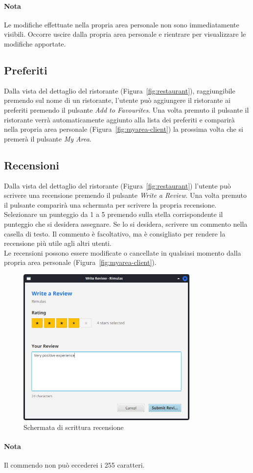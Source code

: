 \paragraph{Nota}
Le modifiche effettuate nella propria area 
personale non sono immediatamente visibili. Occorre uscire 
dalla propria area personale e rientrare per visualizzare 
le modifiche apportate.

\subsection{Preferiti}
Dalla vista del dettaglio del ristorante (Figura~\ref{fig:restaurant}), 
raggiungibile premendo sul nome di un ristorante, l'utente può 
aggiungere il ristorante ai preferiti premendo il pulsante 
\emph{Add to Favourites}. Una volta premuto il pulsante il ristorante 
verrà automaticamente aggiunto alla lista dei preferiti e comparirà
nella propria area personale (Figura~\ref{fig:myarea-client}) la 
prossima volta che si premerà il pulsante \emph{My Area}.

\subsection{Recensioni}
Dalla vista del dettaglio del ristorante (Figura~\ref{fig:restaurant})
l'utente può scrivere una recensione premendo il pulsante 
\emph{Write a Review}. 
Una volta premuto il pulsante comparirà una schermata per scrivere 
la propria recensione.\\
Selezionare un punteggio da 1 a 5 premendo sulla stella corrispondente
il punteggio che si desidera assegnare.
Se lo si desidera, scrivere un commento nella casella di testo.
Il commento è facoltativo, ma è consigliato per rendere la recensione
più utile agli altri utenti.\\
Le recensioni possono essere modificate o cancellate in qualsiasi 
momento dalla propria area personale (Figura~\ref{fig:myarea-client}).
\begin{figure}[H]
    \centering
    \includegraphics[width=0.8\textwidth]{images/review.png}
    \caption{Schermata di scrittura recensione}
    \label{fig:review}
\end{figure}
\paragraph{Nota}
Il commendo non può eccederei i 255 caratteri.
